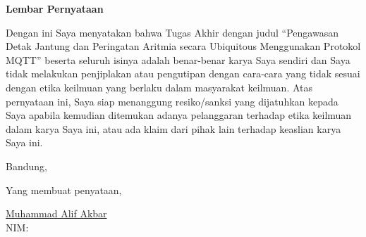 {\centering
\textbf{\large Lembar Pernyataan}\\  %
\vspace{1cm}
}

Dengan ini Saya menyatakan bahwa Tugas Akhir dengan judul “Pengawasan Detak Jantung dan Peringatan Aritmia secara Ubiquitous Menggunakan Protokol MQTT” beserta seluruh isinya adalah benar-benar karya Saya sendiri dan Saya tidak melakukan penjiplakan atau pengutipan dengan cara-cara yang tidak sesuai dengan etika keilmuan yang berlaku dalam masyarakat keilmuan. Atas pernyataan ini, Saya siap menanggung resiko/sanksi yang dijatuhkan kepada Saya apabila kemudian ditemukan adanya pelanggaran terhadap etika keilmuan dalam karya Saya ini, atau ada klaim dari pihak lain terhadap keaslian karya Saya ini. \\
	
\vspace{0.5cm}

\begin{flushleft}
{Bandung, \Tanggal\quad \Bulan \quad \Date}\\
\vspace{0.5cm}

Yang membuat penyataan,\\
\vspace{2cm}

\underline{Muhammad Alif Akbar} \\ 
NIM: \NIM
\end{flushleft}
